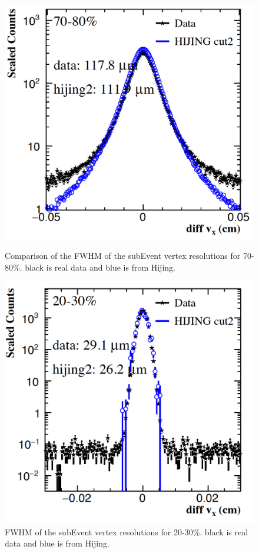 \begin{figure}[htbp]
\begin{minipage}[htbp]{0.47\linewidth}
\centering
\includegraphics[width=1.0\textwidth,angle=0]{figure/Run14_D0HFT/vtxX_70_80.png}
\caption{ Comparison of the FWHM of the subEvent vertex resolutions for 70-80\%. black is real data and blue is from Hijing. \label{vtxX_70_80}}
\end{minipage}
\hfill
\begin{minipage}[htbp]{0.47\linewidth}
\centering
\includegraphics[width=1.0\textwidth,angle=0]{figure/Run14_D0HFT/vtxX_20_30.png} 
\caption{ FWHM of the subEvent vertex resolutions for 20-30\%. black is real data and blue is from Hijing.\label{vtxX_20_30}}
\end{minipage}
\end{figure}

